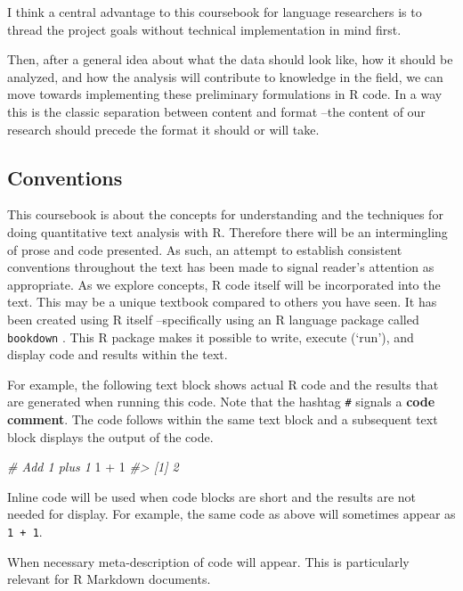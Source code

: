 \documentclass[
]{article}
\newenvironment{Shaded}{\begin{snugshade}}{\end{snugshade}}
\newcommand{\CommentTok}[1]{\textcolor[rgb]{0.56,0.35,0.01}{\textit{#1}}}
\newcommand{\DecValTok}[1]{\textcolor[rgb]{0.00,0.00,0.81}{#1}}
\newcommand{\SpecialCharTok}[1]{\textcolor[rgb]{0.00,0.00,0.00}{#1}}
\begin{document}
I think a central advantage to this coursebook for language researchers is to thread the project goals without technical implementation in mind first.

Then, after a general idea about what the data should look like, how it should be analyzed, and how the analysis will contribute to knowledge in the field, we can move towards implementing these preliminary formulations in R code. In a way this is the classic separation between content and format --the content of our research should precede the format it should or will take.

\hypertarget{conventions}{%
\subsection*{Conventions}\label{conventions}}

This coursebook is about the concepts for understanding and the techniques for doing quantitative text analysis with R. Therefore there will be an intermingling of prose and code presented. As such, an attempt to establish consistent conventions throughout the text has been made to signal reader's attention as appropriate. As we explore concepts, R code itself will be incorporated into the text. This may be a unique textbook compared to others you have seen. It has been created using R itself --specifically using an R language package called \texttt{bookdown} \citep{R-bookdown}. This R package makes it possible to write, execute (`run'), and display code and results within the text.

For example, the following text block shows actual R code and the results that are generated when running this code. Note that the hashtag \texttt{\#} signals a \textbf{code comment}. The code follows within the same text block and a subsequent text block displays the output of the code.

\begin{Shaded}
\begin{Highlighting}[]
\CommentTok{\# Add 1 plus 1}
\DecValTok{1} \SpecialCharTok{+} \DecValTok{1}
\CommentTok{\#\textgreater{} [1] 2}
\end{Highlighting}
\end{Shaded}

Inline code will be used when code blocks are short and the results are not needed for display. For example, the same code as above will sometimes appear as \texttt{1\ +\ 1}.

When necessary meta-description of code will appear. This is particularly relevant for R Markdown documents.
\end{document}
